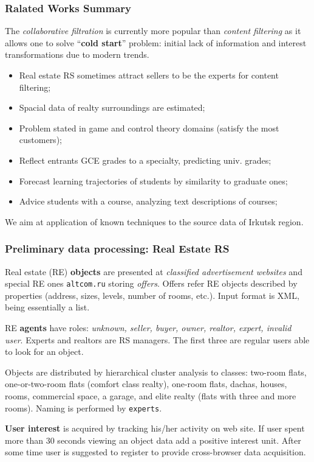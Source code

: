 \documentclass[10pt,dvipsnames]{beamer}
\begin{document}
\begin{frame}
  \frametitle{Ralated Works Summary}
  The \emph{collaborative filtration} is currently more popular than \emph{content filtering} as it allows one to solve ``\textbf{cold start}'' problem: initial lack of information and interest transformations due to modern trends.
  \begin{itemize}
  \item Real estate RS sometimes attract sellers to be the experts for content filtering;
  \item Spacial data of realty surroundings are estimated;
  \item Problem stated in game and control theory domains (satisfy the most customers);
  \item Reflect entrants GCE grades to a specialty, predicting univ. grades;
  \item Forecast learning trajectories of students by similarity to graduate ones;
  \item Advice students with a course, analyzing text descriptions of courses;
  \end{itemize}

  We aim at application of known techniques to the source data of Irkutsk region.
\end{frame}

\begin{frame}
  \frametitle{Preliminary data processing: Real Estate RS}
  Real estate (RE) \textbf{objects} are presented at \emph{classified advertisement websites} and special RE ones \texttt{altcom.ru} storing \emph{offers}.  Offers refer RE objects described by properties (address, sizes, levels, number of rooms, etc.).  Input format is XML, being essentially a list.

  RE \textbf{agents} have roles: \emph{unknown, seller, buyer, owner, realtor, expert, invalid user}.  Experts and realtors are RS managers.  The first three are regular users able to look for an object.

  Objects are distributed by hierarchical cluster analysis to classes: {\color{JungleGreen}two-room flats}, {\color{Melon}one-or-two-room flats} (comfort class realty), {\color{RawSienna}one-room flats}, {\color{Periwinkle}dachas}, {\color{ForestGreen}houses}, {\color{Mahogany}rooms}, {\color{Dandelion}commercial space}, {\color{Plum}a garage}, and {\color{MidnightBlue}elite realty} (flats with three and more rooms).  Naming is performed by \texttt{experts}.

  \textbf{User interest} is acquired by tracking his/her activity on web site. If user spent more than 30 seconds viewing an object data add a positive interest unit.  After some time user is suggested to register to provide cross-browser data acquisition.
\end{frame}
\end{document}
